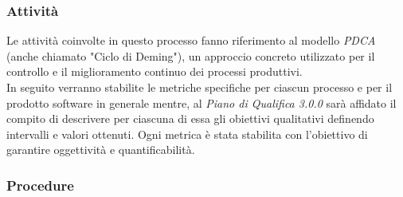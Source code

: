 \subsubsection{Attività}
Le attività coinvolte in questo processo fanno riferimento al modello \textit{PDCA\glo} (anche chiamato "Ciclo di Deming"), un approccio concreto utilizzato per il controllo e il miglioramento continuo dei processi produttivi.\\
In seguito verranno stabilite le metriche specifiche per ciascun processo e per il prodotto software in generale mentre, al \textit{Piano di Qualifica 3.0.0\doc} sarà affidato il compito di descrivere per ciascuna di essa gli obiettivi qualitativi definendo intervalli e valori ottenuti. Ogni metrica è stata stabilita con l'obiettivo di garantire oggettività e quantificabilità.



\subsubsection{Procedure}
